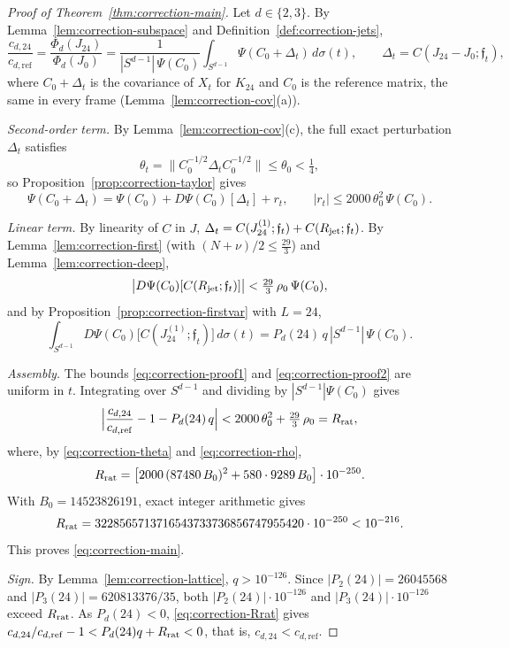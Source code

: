 \begin{proof}[Proof of Theorem~\ref{thm:correction-main}]
Let $d\in\{2,3\}$. By Lemma~\ref{lem:correction-subspace} and Definition~\ref{def:correction-jets},
\[
\frac{c_{d,24}}{c_{d,\mathrm{ref}}}=\frac{\Phi_d(J_{24})}{\Phi_d(J_0)}=\frac{1}{|S^{d-1}|\,\Psi(C_0)}\int_{S^{d-1}}\Psi(C_0+\Delta_t)\,d\sigma(t),\qquad \Delta_t=C(J_{24}-J_0;\mathfrak f_t),
\]
where $C_0+\Delta_t$ is the covariance of $X_t$ for $K_{24}$ and $C_0$ is the reference matrix, the same in every frame (Lemma~\ref{lem:correction-cov}(a)).

\emph{Second-order term.} By Lemma~\ref{lem:correction-cov}(c), the full exact perturbation $\Delta_t$ satisfies
\[
\theta_t=\bigl\|C_0^{-1/2}\Delta_tC_0^{-1/2}\bigr\|\le\theta_0<\tfrac14,
\]
so Proposition~\ref{prop:correction-taylor} gives
\begin{equation}\label{eq:correction-proof1}
\Psi(C_0+\Delta_t)=\Psi(C_0)+D\Psi(C_0)[\Delta_t]+r_t,\qquad |r_t|\le2000\,\theta_0^2\,\Psi(C_0).
\end{equation}

\emph{Linear term.} By linearity of $C$ in $J$, $\Delta_t=C(J^{(1)}_{24};\mathfrak f_t)+C(R_{\rm jet};\mathfrak f_t)$. By Lemma~\ref{lem:correction-first} (with $(N+\nu)/2\le\frac{29}3$) and Lemma~\ref{lem:correction-deep},
\begin{equation}\label{eq:correction-proof2}
\bigl|D\Psi(C_0)[C(R_{\rm jet};\mathfrak f_t)]\bigr|<\tfrac{29}3\,\rho_0\,\Psi(C_0),
\end{equation}
and by Proposition~\ref{prop:correction-firstvar} with $L=24$,
\begin{equation}\label{eq:correction-proof3}
\int_{S^{d-1}}D\Psi(C_0)\bigl[C(J^{(1)}_{24};\mathfrak f_t)\bigr]\,d\sigma(t)=P_d(24)\,q\,|S^{d-1}|\,\Psi(C_0).
\end{equation}

\emph{Assembly.} The bounds \eqref{eq:correction-proof1} and \eqref{eq:correction-proof2} are uniform in $t$. Integrating over $S^{d-1}$ and dividing by $|S^{d-1}|\Psi(C_0)$ gives
\begin{equation}\label{eq:correction-Rrat}
\Bigl|\frac{c_{d,24}}{c_{d,\mathrm{ref}}}-1-P_d(24)\,q\Bigr|<2000\,\theta_0^2+\tfrac{29}3\,\rho_0=R_{\rm rat},
\end{equation}
where, by \eqref{eq:correction-theta} and \eqref{eq:correction-rho},
\begin{equation}\label{eq:correction-Rrat-value}
R_{\rm rat}=\bigl[2000\,(87480\,B_0)^2+580\cdot9289\,B_0\bigr]\cdot10^{-250}.
\end{equation}
With $B_0=14523826191$, exact integer arithmetic gives
\[
R_{\rm rat}=3228565713716543733736856747955420\cdot10^{-250}<10^{-216}.
\]
This proves \eqref{eq:correction-main}.

\emph{Sign.} By Lemma~\ref{lem:correction-lattice}, $q>10^{-126}$. Since $|P_2(24)|=26045568$ and $|P_3(24)|=620813376/35$, both $|P_2(24)|\cdot10^{-126}$ and $|P_3(24)|\cdot10^{-126}$ exceed $R_{\rm rat}$. As $P_d(24)<0$, \eqref{eq:correction-Rrat} gives $c_{d,24}/c_{d,\mathrm{ref}}-1<P_d(24)q+R_{\rm rat}<0$, that is, $c_{d,24}<c_{d,\mathrm{ref}}$.
\end{proof}

